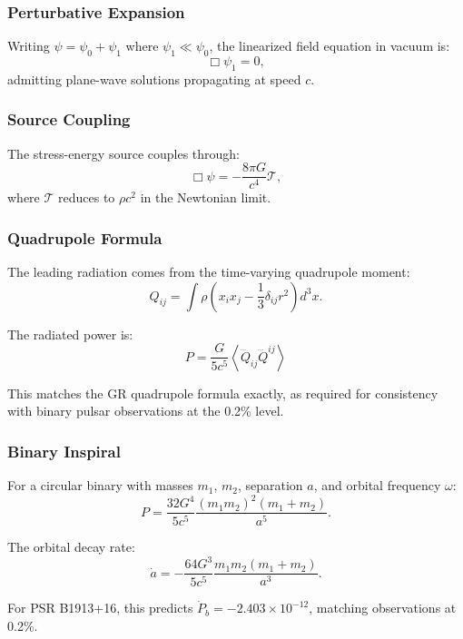 \subsubsection{Perturbative Expansion}

Writing $\psi = \psi_0 + \psi_1$ where $\psi_1 \ll \psi_0$, the linearized 
field equation in vacuum is:
\begin{equation}
\Box \psi_1 = 0,
\end{equation}
admitting plane-wave solutions propagating at speed $c$.

\subsubsection{Source Coupling}

The stress-energy source couples through:
\begin{equation}
\Box \psi = -\frac{8\pi G}{c^4}\mathcal{T},
\end{equation}
where $\mathcal{T}$ reduces to $\rho c^2$ in the Newtonian limit.

\subsubsection{Quadrupole Formula}

The leading radiation comes from the time-varying quadrupole moment:
\begin{equation}
Q_{ij} = \int \rho\left(x_i x_j - \frac{1}{3}\delta_{ij}r^2\right)d^3x.
\end{equation}

The radiated power is:
\begin{equation}
\boxed{P = \frac{G}{5c^5}\left\langle\dddot{Q}_{ij}\dddot{Q}^{ij}\right\rangle}
\label{eq:quadrupole}
\end{equation}

This matches the GR quadrupole formula exactly, as required for consistency 
with binary pulsar observations at the 0.2\% level.

\subsubsection{Binary Inspiral}

For a circular binary with masses $m_1$, $m_2$, separation $a$, and 
orbital frequency $\omega$:
\begin{equation}
P = \frac{32G^4}{5c^5}\frac{(m_1 m_2)^2(m_1+m_2)}{a^5}.
\end{equation}

The orbital decay rate:
\begin{equation}
\dot{a} = -\frac{64G^3}{5c^5}\frac{m_1 m_2(m_1+m_2)}{a^3}.
\end{equation}

For PSR B1913+16, this predicts $\dot{P}_b = -2.403 \times 10^{-12}$, 
matching observations at 0.2\%.

